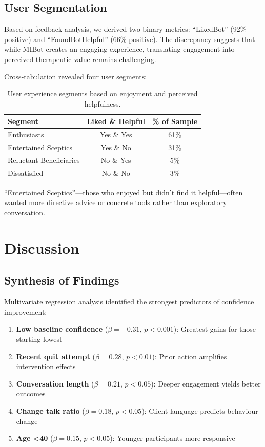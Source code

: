 \subsection{User Segmentation}

Based on feedback analysis, we derived two binary metrics: ``LikedBot'' (92\% positive) and ``FoundBotHelpful'' (66\% positive). The discrepancy suggests that while MIBot creates an engaging experience, translating engagement into perceived therapeutic value remains challenging.

Cross-tabulation revealed four user segments:

\begin{table}[ht]
  \centering
  \small
  \setlength{\tabcolsep}{4pt}
  \renewcommand{\arraystretch}{1.1}
  \begin{tabular}{@{}lcc@{}}
    \toprule
    \textbf{Segment} & \textbf{Liked \& Helpful} & \textbf{\% of Sample} \\
    \midrule
    Enthusiasts & Yes \& Yes & 61\% \\
    Entertained Sceptics & Yes \& No & 31\% \\
    Reluctant Beneficiaries & No \& Yes & 5\% \\
    Dissatisfied & No \& No & 3\% \\
    \bottomrule
  \end{tabular}
  \caption{User experience segments based on enjoyment and perceived helpfulness.}
  \label{table:user_segments}
\end{table}

``Entertained Sceptics''---those who enjoyed but didn't find it helpful---often wanted more directive advice or concrete tools rather than exploratory conversation.

\section{Discussion}
\label{sec:discussion}

\subsection{Synthesis of Findings}

Multivariate regression analysis identified the strongest predictors of confidence improvement:

\begin{enumerate}
\item \textbf{Low baseline confidence} ($\beta=-0.31$, $p<0.001$): Greatest gains for those starting lowest
\item \textbf{Recent quit attempt} ($\beta=0.28$, $p<0.01$): Prior action amplifies intervention effects
\item \textbf{Conversation length} ($\beta=0.21$, $p<0.05$): Deeper engagement yields better outcomes
\item \textbf{Change talk ratio} ($\beta=0.18$, $p<0.05$): Client language predicts behaviour change
\item \textbf{Age <40} ($\beta=0.15$, $p<0.05$): Younger participants more responsive
\end{enumerate}

